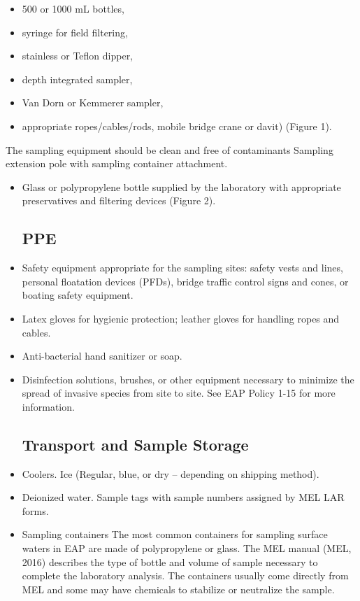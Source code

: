 \documentclass[12pt]{../SOP4_alpha}\usepackage[]{graphicx}\usepackage[]{xcolor}
\begin{document}
\begin{itemize}

\item 500 or 1000 mL bottles, 
\item syringe for field filtering, 
\item stainless or Teflon dipper, 
\item depth integrated sampler, 
\item Van Dorn or Kemmerer sampler, 
\item appropriate ropes/cables/rods, mobile bridge crane or davit)  (Figure 1).  
\end{itemize}
The sampling equipment should be clean and free of contaminants
Sampling extension pole with sampling container attachment.  
\begin{itemize}



\item Glass or polypropylene bottle supplied by the laboratory with appropriate preservatives and filtering devices (Figure 2).  

\subsection{PPE}

\item Safety equipment appropriate for the sampling sites: safety vests and lines, personal floatation devices (PFDs), bridge traffic control signs and cones, or boating safety equipment.  

\item Latex gloves for hygienic protection; leather gloves for handling ropes and cables.  


\item Anti-bacterial hand sanitizer or soap.

\item Disinfection solutions, brushes, or other equipment necessary to minimize the spread of invasive species from site to site. See EAP Policy 1-15 for more information.  

\subsection{Transport and Sample Storage}

\item Coolers.  Ice (Regular, blue, or dry – depending on shipping method).  

\item Deionized water.  Sample tags with sample numbers assigned by MEL  LAR forms.  


\item Sampling containers  The most common containers for sampling surface waters in EAP are made of polypropylene or glass. The MEL manual (MEL, 2016) describes the type of bottle and volume of sample necessary to complete the laboratory analysis. The containers usually come directly from MEL and some may have chemicals to stabilize or neutralize the sample. 

\end{itemize}
\end{document}
